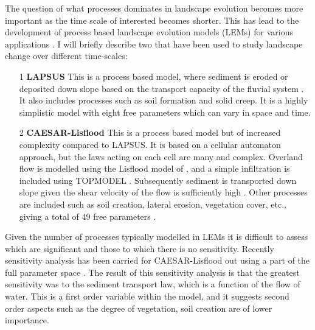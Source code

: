 The question of what processes dominates in landscape evolution becomes more important as the time scale of interested becomes shorter. This has lead to the development of process based landscape evolution models (LEMs) for various applications \citep[see for example][]{temme-etal-2017}. I will briefly describe two that have been used to study landscape change over different time-scales:
\begin{itemize}
\item[1] \textbf{LAPSUS}
This is a process based model, where sediment is eroded or deposited down slope based on the transport capacity of the fluvial system \citep{schoorl-etal-2000}. It also includes processes such as soil formation and solid creep. It is a highly simplistic model with eight free parameters which can vary in space and time.
\item[2] \textbf{CAESAR-Lisflood}
This is a process based model but of increased complexity compared to LAPSUS. It is based on a cellular automaton approach, but the laws acting on each cell are many and complex. Overland flow is modelled using the Lisflood model of \cite{bates-etal-2010}, and a simple infiltration is included using TOPMODEL \citep{beven-1979}. Subsequently sediment is transported down slope given the shear velocity of the flow is sufficiently high \citep{coulthard-etal-2013,vandeweil-etal-2007}. Other processes are included such as soil creation, lateral erosion, vegetation cover, etc., giving a total of 49 free parameters \citep{skinner-etal-2018}.
\end{itemize}
Given the number of processes typically modelled in LEMs it is difficult to assess which are significant and those to which there is no sensitivity. Recently sensitivity analysis has been carried for CAESAR-Lisflood out using a part of the full parameter space \citep{skinner-etal-2018}. The result of this sensitivity analysis is that the greatest sensitivity was to the sediment transport law, which is a function of the flow of water. This is a first order variable within the model, and it suggests second order aspects such as the degree of vegetation, soil creation are of lower importance.

